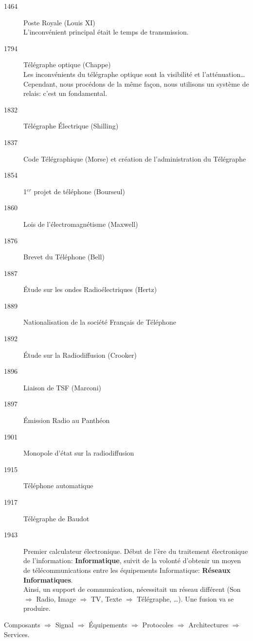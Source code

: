 		\begin{description}
			\item[1464] Poste Royale (Louis XI)\\
				L'inconvénient principal était le temps de transmission.
			\item[1794] Télégraphe optique (Chappe)\\
		Les inconvénients du télégraphe optique sont la visibilité et l'atténuation\ldots Cependant, nous procédons de la même façon, nous utilisons un système de relais: c'est un fondamental.
			\item[1832] Télégraphe \'Electrique (Shilling)
			\item[1837] Code Télégraphique (Morse) et création de l'administration du Télégraphe
			\item[1854] 1$^{er}$ projet de téléphone (Bourseul)
			\item[1860] Lois de l'électromagnétisme (Maxwell)
			\item[1876] Brevet du Téléphone (Bell)
			\item[1887] \'Etude sur les ondes Radioélectriques (Hertz)
			\item[1889] Nationalisation de la société Français de Téléphone
			\item[1892] \'Etude sur la Radiodiffusion (Crooker)
			\item[1896] Liaison de TSF (Marconi)
			\item[1897] \'Emission Radio au Panthéon
			\item[1901] Monopole d'état sur la radiodiffusion
			\item[1915] Téléphone automatique
			\item[1917] Télégraphe de Baudot
			\item[1943] Premier calculateur électronique. Début de l'ère du traitement électronique de l'information: \textbf{Informatique}, 
				suivit de la volonté d'obtenir un moyen de télécommunications entre les équipements Informatique: \textbf{Réseaux Informatiques}.\\ Ainsi, un support de communication, nécessitait un réseau différent (Son $\Rightarrow$ Radio, Image $\Rightarrow$ TV, Texte $\Rightarrow$ Télégraphe, \ldots). Une fusion va se produire.
		\end{description}

		Composants $\Rightarrow$ Signal $\Rightarrow$ Équipements $\Rightarrow$ Protocoles $\Rightarrow$ Architectures $\Rightarrow$ Services.

